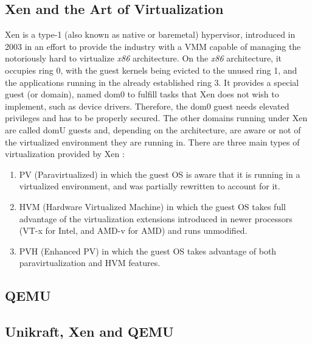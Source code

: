
\subsection{Xen and the Art of Virtualization \cite{art-of-xen}}
\label{subsec:art-of-virtualization}

Xen is a type-1 (also known as native or baremetal) hypervisor, introduced in 2003 in an effort to provide the industry with a VMM capable of managing the notoriously hard to virtualize \textit{x86} architecture.
On the \textit{x86} architecture, it occupies ring 0, with the guest kernels being evicted to the unused ring 1, and the applications running in the already established ring 3.
It provides a special guest (or domain), named dom0 to fulfill tasks that Xen does not wish to implement, such as device drivers.
Therefore, the dom0 guest needs elevated privileges and has to be properly secured.
The other domains running under Xen are called domU guests and, depending on the architecture, are aware or not of the virtualized environment they are running in.
There are three main types of virtualization provided by Xen \cite{xen-virtualization-types}:

\begin{enumerate}
  \item PV (Paravirtualized) in which the guest OS is aware that it is running in a virtualized environment, and was partially rewritten to account for it.
  \item HVM (Hardware Virtualized Machine) in which the guest OS takes full advantage of the virtualization extensions introduced in newer processors (VT-x for Intel, and AMD-v for AMD) and runs unmodified.
  \item PVH (Enhanced PV) in which the guest OS takes advantage of both paravirtualization and HVM features.
\end{enumerate}

\subsection{QEMU}
\label{subsec:qemu}

\subsection{Unikraft, Xen and QEMU}
\label{subsec:unikraft-xen}



